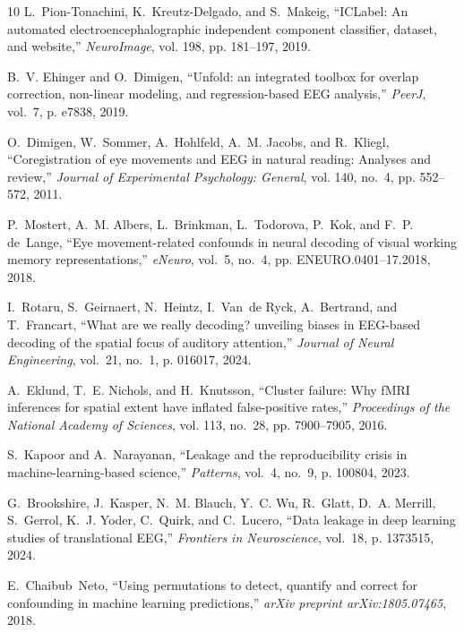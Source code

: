 \documentclass[conference]{IEEEtran}
\begin{document}
\begin{thebibliography}{10}
L.~Pion-Tonachini, K.~Kreutz-Delgado, and S.~Makeig, ``{ICLabel}: An automated
  electroencephalographic independent component classifier, dataset, and
  website,'' \emph{NeuroImage}, vol. 198, pp. 181--197, 2019.

B.~V. Ehinger and O.~Dimigen, ``Unfold: an integrated toolbox for overlap
  correction, non-linear modeling, and regression-based {EEG} analysis,''
  \emph{PeerJ}, vol.~7, p. e7838, 2019.

O.~Dimigen, W.~Sommer, A.~Hohlfeld, A.~M. Jacobs, and R.~Kliegl,
  ``Coregistration of eye movements and {EEG} in natural reading: Analyses and
  review,'' \emph{Journal of Experimental Psychology: General}, vol. 140,
  no.~4, pp. 552--572, 2011.

P.~Mostert, A.~M. Albers, L.~Brinkman, L.~Todorova, P.~Kok, and F.~P. de~Lange,
  ``Eye movement-related confounds in neural decoding of visual working memory
  representations,'' \emph{eNeuro}, vol.~5, no.~4, pp. ENEURO.0401--17.2018,
  2018.

I.~Rotaru, S.~Geirnaert, N.~Heintz, I.~Van~de Ryck, A.~Bertrand, and
  T.~Francart, ``What are we really decoding? unveiling biases in {EEG}-based
  decoding of the spatial focus of auditory attention,'' \emph{Journal of
  Neural Engineering}, vol.~21, no.~1, p. 016017, 2024.

A.~Eklund, T.~E. Nichols, and H.~Knutsson, ``Cluster failure: Why {fMRI}
  inferences for spatial extent have inflated false-positive rates,''
  \emph{Proceedings of the National Academy of Sciences}, vol. 113, no.~28, pp.
  7900--7905, 2016.

S.~Kapoor and A.~Narayanan, ``Leakage and the reproducibility crisis in
  machine-learning-based science,'' \emph{Patterns}, vol.~4, no.~9, p. 100804,
  2023.

G.~Brookshire, J.~Kasper, N.~M. Blauch, Y.~C. Wu, R.~Glatt, D.~A. Merrill,
  S.~Gerrol, K.~J. Yoder, C.~Quirk, and C.~Lucero, ``Data leakage in deep
  learning studies of translational {EEG},'' \emph{Frontiers in Neuroscience},
  vol.~18, p. 1373515, 2024.

E.~Chaibub~Neto, ``Using permutations to detect, quantify and correct for
  confounding in machine learning predictions,'' \emph{arXiv preprint
  arXiv:1805.07465}, 2018.


\end{thebibliography}
\end{document}
